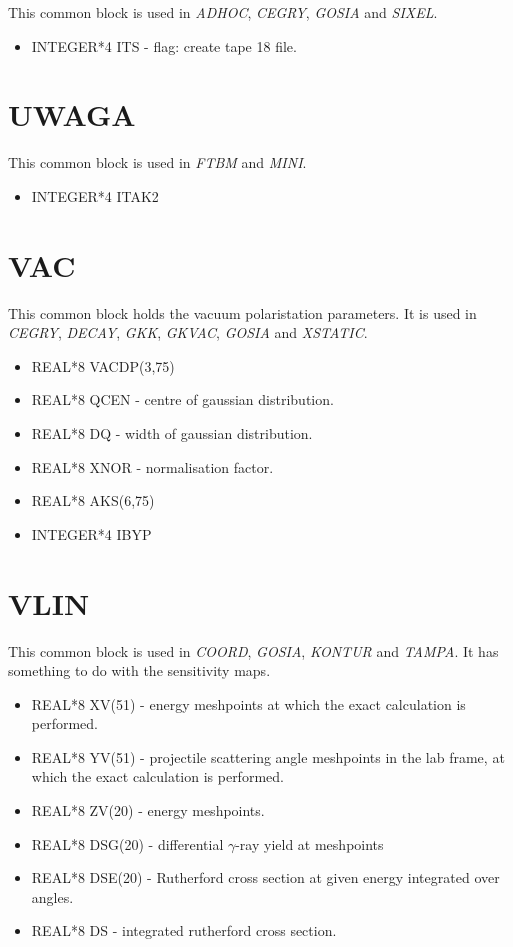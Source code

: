 This common block is used in {\em ADHOC}, {\em CEGRY}, {\em GOSIA} and {\em
SIXEL}.

\begin{itemize}
\item INTEGER*4 ITS - flag: create tape 18 file.
\end{itemize}

\section{UWAGA}

This common block is used in {\em FTBM} and {\em MINI}.

\begin{itemize}
\item INTEGER*4 ITAK2
\end{itemize}

\section{VAC}

This common block holds the vacuum polaristation parameters. It is used in
{\em CEGRY}, {\em DECAY}, {\em GKK}, {\em GKVAC}, {\em GOSIA} and {\em
XSTATIC}.

\begin{itemize}
\item REAL*8 VACDP(3,75)
\item REAL*8 QCEN - centre of gaussian distribution.
\item REAL*8 DQ - width of gaussian distribution.
\item REAL*8 XNOR - normalisation factor.
\item REAL*8 AKS(6,75)
\item INTEGER*4 IBYP
\end{itemize}

\section{VLIN}

This common block is used in {\em COORD}, {\em GOSIA}, {\em KONTUR} and {\em
TAMPA}. It has something to do with the sensitivity maps.

\begin{itemize}
\item REAL*8 XV(51) - energy meshpoints at which the exact calculation is
performed.
\item REAL*8 YV(51) - projectile scattering angle meshpoints in the lab
frame, at which the exact calculation is performed.
\item REAL*8 ZV(20) - energy meshpoints.
\item REAL*8 DSG(20) - differential $\gamma$-ray yield at meshpoints
\item REAL*8 DSE(20) - Rutherford cross section at given energy integrated
over angles.
\item REAL*8 DS - integrated rutherford cross section.
\end{itemize}

